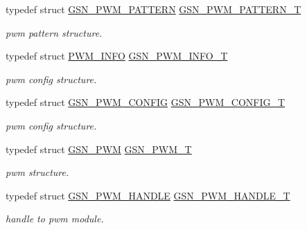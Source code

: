 \begin{DoxyCompactItemize}
typedef struct \hyperlink{a00183}{GSN\_\-PWM\_\-PATTERN} \hyperlink{a00650_ga3a1ee0c27116f4c45c7d0369eb2723a3}{GSN\_\-PWM\_\-PATTERN\_\-T}
\begin{DoxyCompactList}\small\item\em pwm pattern structure. \end{DoxyCompactList}\item 
typedef struct \hyperlink{a00454}{PWM\_\-INFO} \hyperlink{a00650_gaf27034c3354002d4d9ab5141852aea8a}{GSN\_\-PWM\_\-INFO\_\-T}
\begin{DoxyCompactList}\small\item\em pwm config structure. \end{DoxyCompactList}\item 
typedef struct \hyperlink{a00181}{GSN\_\-PWM\_\-CONFIG} \hyperlink{a00650_ga635ed55bc6092da2e511379b0b6f6c64}{GSN\_\-PWM\_\-CONFIG\_\-T}
\begin{DoxyCompactList}\small\item\em pwm config structure. \end{DoxyCompactList}\item 
typedef struct \hyperlink{a00180}{GSN\_\-PWM} \hyperlink{a00650_gad6886352df79f09ac5070d71f1117f7f}{GSN\_\-PWM\_\-T}
\begin{DoxyCompactList}\small\item\em pwm structure. \end{DoxyCompactList}\item 
typedef struct \hyperlink{a00182}{GSN\_\-PWM\_\-HANDLE} \hyperlink{a00650_ga8be9b48972007ba1d54815d6743d13e6}{GSN\_\-PWM\_\-HANDLE\_\-T}
\begin{DoxyCompactList}\small\item\em handle to pwm module. \end{DoxyCompactList}\end{DoxyCompactItemize}

